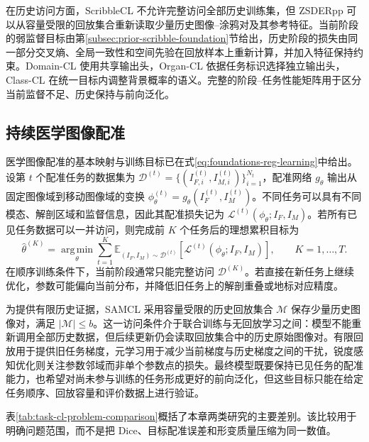 在历史访问方面，ScribbleCL 不允许完整访问全部历史训练集，但 ZSDERpp 可以从容量受限的回放集合重新读取少量历史图像--涂鸦对及其参考特征。当前阶段的弱监督目标由第\ref{subsec:prior-scribble-foundation}节给出，历史阶段的损失由同一部分交叉熵、全局一致性和空间先验在回放样本上重新计算，并加入特征保持约束。Domain-CL 使用共享输出头，Organ-CL 依据任务标识选择独立输出头，Class-CL 在统一目标内调整背景概率的语义。完整的阶段--任务性能矩阵用于区分当前监督不足、历史保持与前向泛化。


\subsection{持续医学图像配准}
\label{subsec:task-cl-registration-formulation}

医学图像配准的基本映射与训练目标已在式\eqref{eq:foundations-reg-learning}中给出。设第 $t$ 个配准任务的数据集为
$\mathcal{D}^{(t)}=\{(I_{F,i}^{(t)},I_{M,i}^{(t)})\}_{i=1}^{N_t}$，配准网络
$g_{\theta}$ 输出从固定图像域到移动图像域的变换
$\phi_{\theta}^{(t)}=g_{\theta}(I_F^{(t)},I_M^{(t)})$。不同任务可以具有不同模态、解剖区域和监督信息，因此其配准损失记为
$\mathcal{L}^{(t)}(\phi_{\theta};I_F,I_M)$。若所有已见任务数据可以一并访问，则完成前 $K$ 个任务后的理想累积目标为
\begin{equation}
\widehat{\theta}^{(K)}
=
\operatorname*{arg\,min}_{\theta}
\sum_{t=1}^{K}
\mathbb{E}_{(I_F,I_M)\sim\mathcal{D}^{(t)}}
\left[
\mathcal{L}^{(t)}(\phi_{\theta};I_F,I_M)
\right],
\qquad K=1,\ldots,T.
\label{eq:samcl-cumulative-objective}
\end{equation}
在顺序训练条件下，当前阶段通常只能完整访问 $\mathcal{D}^{(K)}$。若直接在新任务上继续优化，参数可能偏向当前分布，并降低旧任务上的解剖重叠或地标对应精度。

为提供有限历史证据，SAMCL 采用容量受限的历史回放集合 $\mathcal{M}$ 保存少量历史图像对，满足
$|\mathcal{M}|\leq b$。这一访问条件介于联合训练与无回放学习之间：模型不能重新调用全部历史数据，但后续更新仍会读取回放集合中的历史原始图像对。有限回放用于提供旧任务梯度，元学习用于减少当前梯度与历史梯度之间的干扰，锐度感知优化则关注参数邻域而非单个参数点的损失。最终模型既要保持已见任务的配准能力，也希望对尚未参与训练的任务形成更好的前向泛化，但这些目标只能在给定任务顺序、回放容量和评价数据上进行验证。

表\ref{tab:task-cl-problem-comparison}概括了本章两类研究的主要差别。该比较用于明确问题范围，而不是把 Dice、目标配准误差和形变质量压缩为同一数值。

